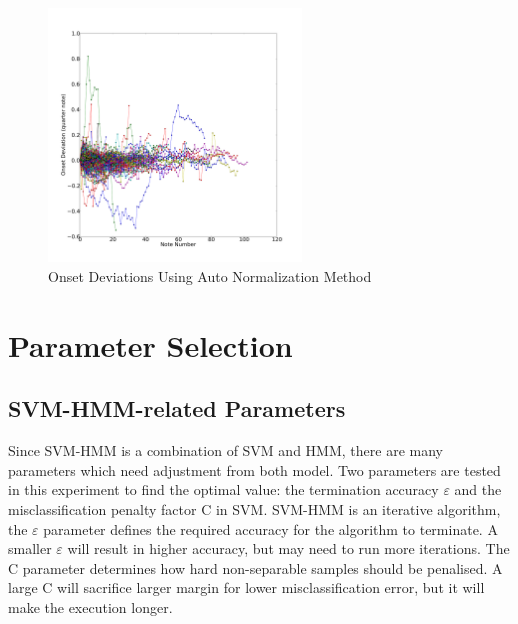 
\begin{figure}[tp]
   \begin{center}
      \includegraphics[width=0.6\textwidth]{fig/lian_onset_1}
   \end{center}
   \caption{Onset Deviations Using Auto Normalization Method}
   \label{fig:normauto}
\end{figure}


\section{Parameter Selection}
\label{sec:paramselect}
\subsection{SVM-HMM-related Parameters}
Since SVM-HMM is a combination of SVM and HMM, there are many parameters which need adjustment from both model. Two parameters are tested in this experiment to find the optimal value: the termination accuracy $\varepsilon$ and the misclassification penalty factor C in SVM. SVM-HMM is an iterative algorithm, the $\varepsilon$ parameter defines the required accuracy for the algorithm to terminate. A smaller $\varepsilon$ will result in higher accuracy, but may need to run more iterations. The C parameter determines how hard non-separable samples should be penalised. A large C will sacrifice larger margin for lower misclassification error, but it will make the execution longer.%

